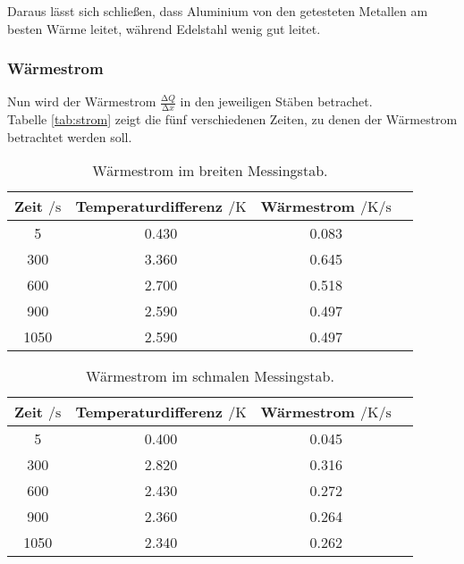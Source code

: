   \noindent Daraus lässt sich schließen, dass Aluminium von den getesteten Metallen am besten Wärme leitet, während Edelstahl wenig gut leitet.

  \subsubsection{Wärmestrom}
  Nun wird der Wärmestrom $ \frac{\increment Q}{\increment x}$ in den jeweiligen Stäben betrachet. \\
  Tabelle \ref{tab:strom} zeigt die fünf verschiedenen Zeiten, zu denen der Wärmestrom betrachtet werden soll. 

  \begin{table}
    \centering
    \caption{Wärmestrom im breiten Messingstab.}
    \label{tabl:strom}
    \begin{tabular}{c c c c}
      \toprule
      Zeit $\mathbin{/} \si{\s}$ & Temperaturdifferenz $\mathbin{/} \si{\kelvin}$& Wärmestrom $\mathbin{/} \si{\kelvin\per\s}$\\
      \midrule
      5 & 0.430 & 0.083 \\
      300 & 3.360 & 0.645 \\
      600 & 2.700 & 0.518 \\
      900 & 2.590 & 0.497 \\
      1050 & 2.590 & 0.497\\
      \bottomrule
    \end{tabular}
  \end{table}

  \begin{table}
    \centering
    \caption{Wärmestrom im schmalen Messingstab.}
    \label{tabl:strom}
    \begin{tabular}{c c c c}
      \toprule
      Zeit $\mathbin{/} \si{\s}$ & Temperaturdifferenz $\mathbin{/} \si{\kelvin}$& Wärmestrom $\mathbin{/} \si{\kelvin\per\s}$\\
      \midrule
      5 & 0.400 & 0.045\\
      300 & 2.820 & 0.316\\
      600 & 2.430 & 0.272\\
      900 & 2.360 & 0.264\\
      1050 & 2.340 & 0.262\\ %
      \bottomrule
    \end{tabular}
  \end{table}


